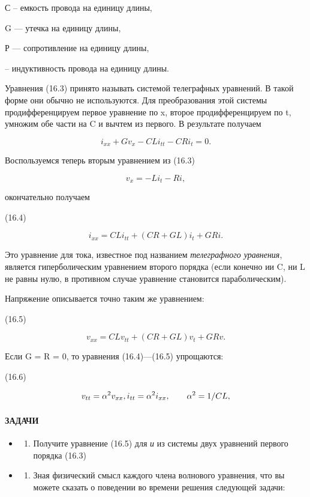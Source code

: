 \documentclass[
  ukrainian,
]{article}
\providecommand{\tightlist}{%
  \setlength{\itemsep}{0pt}\setlength{\parskip}{0pt}}
\begin{document}
С -- емкость провода на единицу длины,

G --- утечка на единицу длины,

Р --- сопротивление на единицу длины,

-- индуктивность провода на единицу длины.

Уравнения (16.3) принято называть системой телеграфных уравнений. В
такой форме они обычно не используются. Для преобразования этой системы
продифференцируем первое уравнение по x, второе продифференцируем по t,
умножим обе части на C и вычтем из первого. В результате получаем

\[
i_{xx} + Gv_x - CLi_{tt} - CRi_t = 0.
\]

Воспользуемся теперь вторым уравнением из (16.3)

\[
v_{x} = -Li_{t} - Ri,
\]

окончательно получаем

(16.4)

\[
i_{xx} = CLi_{tt} + (CR + GL)i_t + GRi.
\]

Это уравнение для тока, известное под названием \emph{телеграфного
уравнения}, является гиперболическим уравнением второго порядка (если
конечно ии C, ни L не равны нулю, в противном случае уравнение
становится параболическим).

Напряжение описывается точно таким же уравнением:

(16.5)

\[
v_{xx} = CLv_{tt} + (CR + GL)v_t + GRv.
\]

Если G = R = 0, то уравнения (16.4)---(16.5) упрощаются:

(16.6)

\[
v_{tt} = \alpha^2 v_{xx}, \\ i_{tt} = \alpha^2 i_{xx}, \qquad \alpha^2 = 1/CL,
\]

\paragraph{ЗАДАЧИ}\label{ux437ux430ux434ux430ux447ux438-1}

\begin{itemize}
\tightlist
\item
  \begin{enumerate}
  \def\labelenumi{\arabic{enumi}.}
  \tightlist
  \item
    Получите уравнение (16.5) для \emph{и} из системы двух уравнений
    первого порядка (16.3)
  \end{enumerate}
\item
  \begin{enumerate}
  \def\labelenumi{\arabic{enumi}.}
  \setcounter{enumi}{1}
  \tightlist
  \item
    Зная физический смысл каждого члена волнового уравнения, что вы
    можете сказать о поведении во времени решения следующей задачи:
  \end{enumerate}
\end{itemize}
\end{document}
